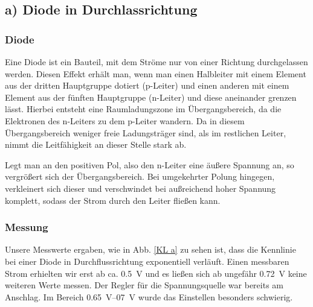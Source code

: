 \documentclass[11pt,a4paper,titlepage, ngerman]{article}
\begin{document}
		\subsection{a) Diode in Durchlassrichtung} 
			\label{a)}
			
			\subsubsection*{Diode}
				\label{Diode}
								
				Eine Diode ist ein Bauteil, mit dem Ströme nur von einer Richtung durchgelassen werden.
				Diesen Effekt erhält man, wenn man einen Halbleiter mit einem Element aus der dritten Hauptgruppe dotiert (p-Leiter) und einen anderen mit einem Element aus der fünften Hauptgruppe (n-Leiter) und diese aneinander grenzen lässt.
				Hierbei entsteht eine Raumladungszone im Übergangsbereich, da die Elektronen des n-Leiters zu dem p-Leiter wandern.
				Da in diesem Übergangsbereich weniger freie Ladungsträger sind, als im restlichen Leiter, nimmt die Leitfähigkeit an dieser Stelle stark ab.
				

				Legt man an den positiven Pol, also den n-Leiter eine äußere Spannung an, so vergrößert sich der Übergangsbereich.
				Bei umgekehrter Polung hingegen, verkleinert sich dieser und verschwindet bei außreichend hoher Spannung komplett, sodass der Strom durch den Leiter fließen kann. 
			
			\subsubsection*{Messung}
				
				Unsere Messwerte ergaben, wie in Abb. \ref{KL a} zu sehen ist, dass die Kennlinie bei einer Diode in Durchflussrichtung exponentiell verläuft.
				Einen messbaren Strom erhielten wir erst ab ca. \SI{0.5}{\V} und es ließen sich ab ungefähr \SI{0.72}{\V} keine weiteren Werte messen. Der Regler für die Spannungsquelle war bereits am Anschlag. Im Bereich \SIrange{0,65}{07}{\V} wurde das Einstellen besonders schwierig.
				
\end{document}
